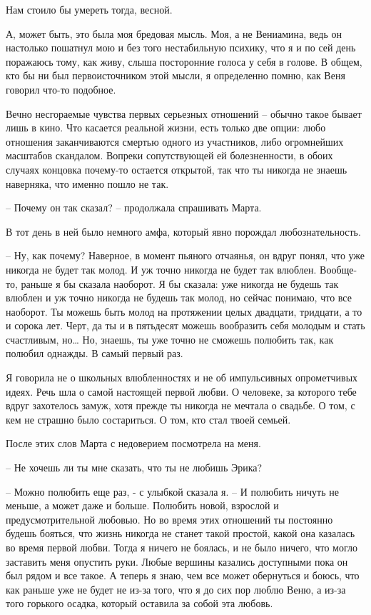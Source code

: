 \documentclass[
]{book}
\begin{document}
Нам стоило бы умереть тогда, весной.

А, может быть, это была моя бредовая мысль. Моя, а не Вениамина, ведь он настолько пошатнул мою и без того нестабильную психику, что я и по сей день поражаюсь тому, как живу, слыша посторонние голоса у себя в голове. В общем, кто бы ни был первоисточником этой мысли, я определенно помню, как Веня говорил что-то подобное.

Вечно несгораемые чувства первых серьезных отношений -- обычно такое бывает лишь в кино. Что касается реальной жизни, есть только две опции: любо отношения заканчиваются смертью одного из участников, либо огромнейших масштабов скандалом. Вопреки сопутствующей ей болезненности, в обоих случаях концовка почему-то остается открытой, так что ты никогда не знаешь наверняка, что именно пошло не так.

-- Почему он так сказал? -- продолжала спрашивать Марта.

В тот день в ней было немного амфа, который явно порождал любознательность.

-- Ну, как почему? Наверное, в момент пьяного отчаянья, он вдруг понял, что уже никогда не будет так молод. И уж точно никогда не будет так влюблен. Вообще-то, раньше я бы сказала наоборот. Я бы сказала: уже никогда не будешь так влюблен и уж точно никогда не будешь так молод, но сейчас понимаю, что все наоборот. Ты можешь быть молод на протяжении целых двадцати, тридцати, а то и сорока лет. Черт, да ты и в пятьдесят можешь вообразить себя молодым и стать счастливым, но\ldots{} Но, знаешь, ты уже точно не сможешь полюбить так, как полюбил однажды. В самый первый раз.

Я говорила не о школьных влюбленностях и не об импульсивных опрометчивых идеях. Речь шла о самой настоящей первой любви. О человеке, за которого тебе вдруг захотелось замуж, хотя прежде ты никогда не мечтала о свадьбе. О том, с кем не страшно было состариться. О том, кто стал твоей семьей.

После этих слов Марта с недоверием посмотрела на меня.

-- Не хочешь ли ты мне сказать, что ты не любишь Эрика?

-- Можно полюбить еще раз, - с улыбкой сказала я. -- И полюбить ничуть не меньше, а может даже и больше. Полюбить новой, взрослой и предусмотрительной любовью. Но во время этих отношений ты постоянно будешь бояться, что жизнь никогда не станет такой простой, какой она казалась во время первой любви. Тогда я ничего не боялась, и не было ничего, что могло заставить меня опустить руки. Любые вершины казались доступными пока он был рядом и все такое. А теперь я знаю, чем все может обернуться и боюсь, что как раньше уже не будет не из-за того, что я до сих пор люблю Веню, а из-за того горького осадка, который оставила за собой эта любовь.
\end{document}
